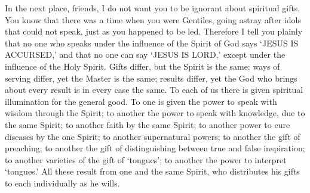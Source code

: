  In the next place, friends, I do not want you to be
ignorant about spiritual gifts.  You know that there was a
time when you were Gentiles, going astray after idols that could not
speak, just as you happened to be led.  Therefore I tell you
plainly that no one who speaks under the influence of the Spirit of God
says `JESUS IS ACCURSED,' and that no one can say `JESUS IS LORD,'
except under the influence of the Holy Spirit.  Gifts
differ, but the Spirit is the same;  ways of serving differ,
yet the Master is the same;  results differ, yet the God who
brings about every result is in every case the same.  To
each of us there is given spiritual illumination for the general good.
 To one is given the power to speak with wisdom through the
Spirit; to another the power to speak with knowledge, due to the same
Spirit;  to another faith by the same Spirit; to another
power to cure diseases by the one Spirit; to another supernatural
powers;  to another the gift of preaching; to another the
gift of distinguishing between true and false inspiration; to another
varieties of the gift of `tongues'; to another the power to interpret
`tongues.'  All these result from one and the same Spirit,
who distributes his gifts to each individually as he wills.

